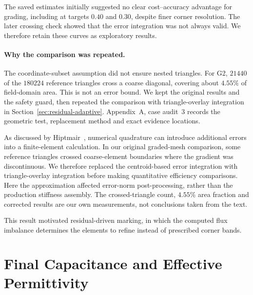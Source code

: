 \documentclass[11pt]{article}
\begin{document}
The saved estimates initially suggested no clear cost--accuracy advantage for grading, including at targets $0.40$ and $0.30$, despite finer corner resolution. The later crossing check showed that the error integration was not always valid. We therefore retain these curves as exploratory results.

\paragraph{Why the comparison was repeated.}
The coordinate-subset assumption did not ensure nested triangles. For G2, $21440$ of the $180224$ reference triangles cross a coarse diagonal, covering about $4.55\%$ of field-domain area. This is not an error bound. We kept the original results and the safety guard, then repeated the comparison with triangle-overlay integration in Section~\ref{sec:residual-adaptive}. Appendix~A, case audit~3 records the geometric test, replacement method and exact evidence locations.

As discussed by Hiptmair~\cite[Sec.~3.5]{hiptmair2025}, numerical quadrature can introduce additional errors into a finite-element calculation. In our original graded-mesh comparison, some reference triangles crossed coarse-element boundaries where the gradient was discontinuous. We therefore replaced the centroid-based error integration with triangle-overlay integration before making quantitative efficiency comparisons. Here the approximation affected error-norm post-processing, rather than the production stiffness assembly. The crossed-triangle count, $4.55\%$ area fraction and corrected results are our own measurements, not conclusions taken from the text.

This result motivated residual-driven marking, in which the computed flux imbalance determines the elements to refine instead of prescribed corner bands.



\section{Final Capacitance and Effective Permittivity}
\end{document}

